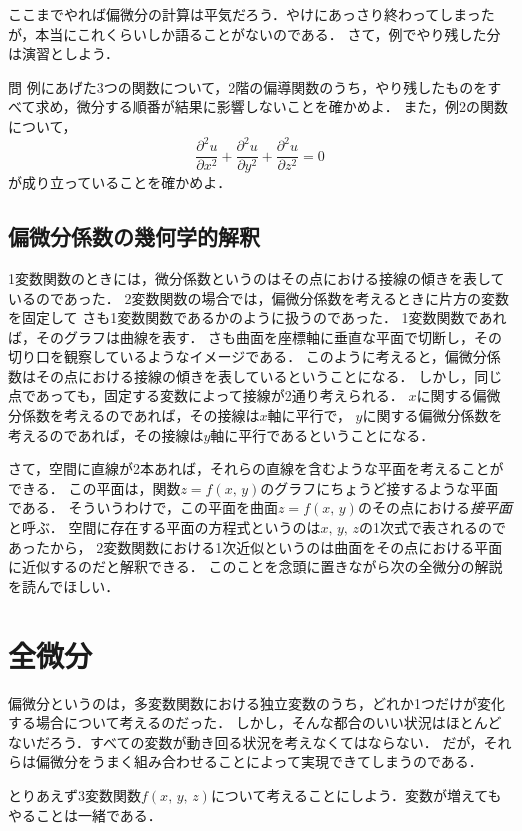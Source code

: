 ここまでやれば偏微分の計算は平気だろう．やけにあっさり終わってしまったが，本当にこれくらいしか語ることがないのである．
さて，例でやり残した分は演習としよう．
\begin{itembox}[l]{問}
例にあげた3つの関数について，2階の偏導関数のうち，やり残したものをすべて求め，微分する順番が結果に影響しないことを確かめよ．
また，例2の関数について，
$$
\frac{\partial^2 u}{\partial x^2}+\frac{\partial^2 u}{\partial y^2}+\frac{\partial^2 u}{\partial z^2} = 0
$$
が成り立っていることを確かめよ．
\end{itembox}
\newpage
\subsection{偏微分係数の幾何学的解釈}
1変数関数のときには，微分係数というのはその点における接線の傾きを表しているのであった．
2変数関数の場合では，偏微分係数を考えるときに片方の変数を固定して
さも1変数関数であるかのように扱うのであった．
1変数関数であれば，そのグラフは曲線を表す．
さも曲面を座標軸に垂直な平面で切断し，その切り口を観察しているようなイメージである．
このように考えると，偏微分係数はその点における接線の傾きを表しているということになる．
しかし，同じ点であっても，固定する変数によって接線が2通り考えられる．
$x$に関する偏微分係数を考えるのであれば，その接線は$x$軸に平行で，
$y$に関する偏微分係数を考えるのであれば，その接線は$y$軸に平行であるということになる．

さて，空間に直線が2本あれば，それらの直線を含むような平面を考えることができる．
この平面は，関数$z=f(x, \, y)$のグラフにちょうど接するような平面である．
そういうわけで，この平面を曲面$z=f(x, \, y)$のその点における\emph{接平面}
と呼ぶ．
空間に存在する平面の方程式というのは$x, \, y, \, z$の1次式で表されるのであったから，
2変数関数における1次近似というのは曲面をその点における平面に近似するのだと解釈できる．
このことを念頭に置きながら次の全微分の解説を読んでほしい．
\newpage
\section{全微分}
偏微分というのは，多変数関数における独立変数のうち，どれか1つだけが変化する場合について考えるのだった．
しかし，そんな都合のいい状況はほとんどないだろう．すべての変数が動き回る状況を考えなくてはならない．
だが，それらは偏微分をうまく組み合わせることによって実現できてしまうのである．

とりあえず3変数関数$f(x, \, y, \, z)$について考えることにしよう．変数が増えてもやることは一緒である．
